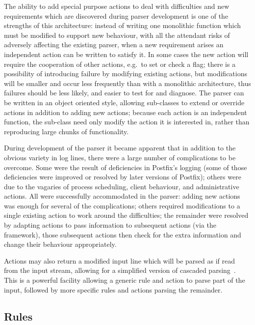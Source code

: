 \documentclass[draft]{svmult}
\begin{document}
The ability to add special purpose actions to deal with difficulties and
new requirements which are discovered during parser development is one of
the strengths of this architecture: instead of writing one monolithic
function which must be modified to support new behaviour, with all the
attendant risks of adversely affecting the existing parser, when a new
requirement arises an independent action can be written to satisfy it.  In
some cases the new action will require the cooperation of other actions,
e.g.\ to set or check a flag; there is a possibility of introducing failure
by modifying existing actions, but modifications will be smaller and occur
less frequently than with a monolithic architecture, thus failures should
be less likely, and easier to test for and diagnose.  The parser can be
written in an object oriented style, allowing sub-classes to extend or
override actions in addition to adding new actions; because each action is
an independent function, the sub-class need only modify the action it is
interested in, rather than reproducing large chunks of functionality.

\label{complications}

During development of the parser it became apparent that in addition to the
obvious variety in log lines, there were a large number of complications to
be overcome.  Some were the result of deficiencies in Postfix's logging
(some of those deficiencies were improved or resolved by later versions of
Postfix); others were due to the vagaries of process scheduling, client
behaviour, and administrative actions.  All were successfully accommodated
in the parser: adding new actions was enough for several of the
complications; others required modifications to a single existing action to
work around the difficulties; the remainder were resolved by adapting
actions to pass information to subsequent actions (via the framework),
those subsequent actions then check for the extra information and change
their behaviour appropriately.

Actions may also return a modified input line which will be parsed as if
read from the input stream, allowing for a simplified version of cascaded
parsing~\cite{cascaded-parsing}.  This is a powerful facility allowing a
generic rule and action to parse part of the input, followed by more
specific rules and actions parsing the remainder.

\subsection{Rules}
\end{document}
